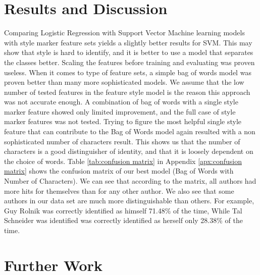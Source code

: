\documentclass[a4paper]{article}
\begin{document}
\section{Results and Discussion}
\label{Results}

Comparing Logistic Regression with Support Vector Machine learning models with style marker feature sets yields a slightly better results for SVM.
This may show that style is hard to identify, and it is better to use a model that separates the classes better.
Scaling the features before training and evaluating was proven useless.
When it comes to type of feature sets, a simple bag of words model was proven better than many more sophisticated models. We assume that the low number of tested features in the feature style model is the reason this approach was not accurate enough. A combination of bag of words with a single style marker feature showed only limited improvement, and the full case of style marker features was not tested.
Trying to figure the most helpful single style feature that can contribute to the Bag of Words model again resulted with a non sophisticated number of characters result. This shows us that the number of characters is a good distinguisher of identity, and that it is loosely dependent on the choice of words.
Table \ref{tab:confusion matrix} in Appendix \ref{apx:confusion matrix} shows the confusion matrix of our best model (Bag of Words with Number of Characters).
We can see that according to the matrix, all authors had more hits for themselves than for any other author.
We also see that some authors in our data set are much more distinguishable than others. For example, Guy Rolnik was correctly identified as himself 71.48\% of the time, While Tal Schneider was identified was correctly identified as herself only 28.38\% of the time.


\section{Further Work}
\label{Further Work}
\end{document}
